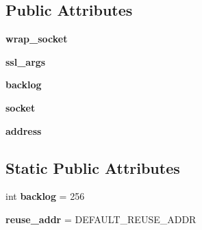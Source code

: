 \subsection*{Public Attributes}
\begin{DoxyCompactItemize}
\item 
\mbox{\label{classgevent_1_1server_1_1_stream_server_a7b9b876826e8850e79698bb21ab2d044}} 
{\bfseries wrap\+\_\+socket}
\item 
\mbox{\label{classgevent_1_1server_1_1_stream_server_afe05061ce04db7c9406a8f16853bb2b0}} 
{\bfseries ssl\+\_\+args}
\item 
\mbox{\label{classgevent_1_1server_1_1_stream_server_a5911ec48c109db3d85f6eefaf0181857}} 
{\bfseries backlog}
\item 
\mbox{\label{classgevent_1_1server_1_1_stream_server_a131efeada552d86d8621779b6e76231b}} 
{\bfseries socket}
\item 
\mbox{\label{classgevent_1_1server_1_1_stream_server_a261e94f88e1c37e45257668eb4693742}} 
{\bfseries address}
\end{DoxyCompactItemize}
\subsection*{Static Public Attributes}
\begin{DoxyCompactItemize}
\item 
\mbox{\label{classgevent_1_1server_1_1_stream_server_a910bf259e9440bc242edd8f14b50fb92}} 
int {\bfseries backlog} = 256
\item 
\mbox{\label{classgevent_1_1server_1_1_stream_server_aacc49a0731e2fc09981aae6a95aae9ff}} 
{\bfseries reuse\+\_\+addr} = D\+E\+F\+A\+U\+L\+T\+\_\+\+R\+E\+U\+S\+E\+\_\+\+A\+D\+DR
\end{DoxyCompactItemize}


